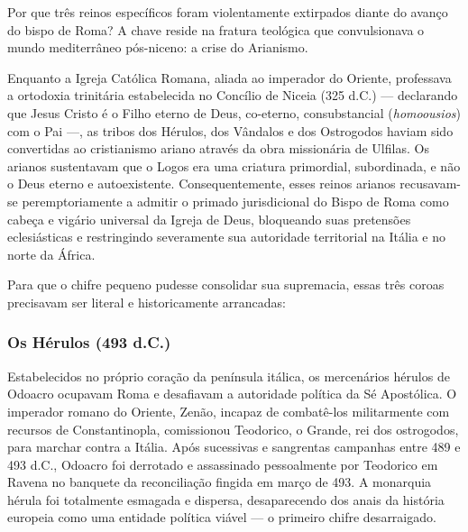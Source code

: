 Por que três reinos específicos foram violentamente extirpados diante do avanço do bispo de Roma? A chave reside na fratura teológica que convulsionava o mundo mediterrâneo pós-niceno: a crise do Arianismo.

Enquanto a Igreja Católica Romana, aliada ao imperador do Oriente, professava a ortodoxia trinitária estabelecida no Concílio de Niceia (325 d.C.) — declarando que Jesus Cristo é o Filho eterno de Deus, co-eterno, consubstancial (\textit{homoousios}) com o Pai —, as tribos dos Hérulos, dos Vândalos e dos Ostrogodos haviam sido convertidas ao cristianismo ariano através da obra missionária de Ulfilas. Os arianos sustentavam que o Logos era uma criatura primordial, subordinada, e não o Deus eterno e autoexistente. Consequentemente, esses reinos arianos recusavam-se peremptoriamente a admitir o primado jurisdicional do Bispo de Roma como cabeça e vigário universal da Igreja de Deus, bloqueando suas pretensões eclesiásticas e restringindo severamente sua autoridade territorial na Itália e no norte da África.

Para que o chifre pequeno pudesse consolidar sua supremacia, essas três coroas precisavam ser literal e historicamente arrancadas:


\subsubsection*{Os Hérulos (493 d.C.)}
Estabelecidos no próprio coração da península itálica, os mercenários hérulos de Odoacro ocupavam Roma e desafiavam a autoridade política da Sé Apostólica. O imperador romano do Oriente, Zenão, incapaz de combatê-los militarmente com recursos de Constantinopla, comissionou Teodorico, o Grande, rei dos ostrogodos, para marchar contra a Itália. Após sucessivas e sangrentas campanhas entre 489 e 493 d.C., Odoacro foi derrotado e assassinado pessoalmente por Teodorico em Ravena no banquete da reconciliação fingida em março de 493. A monarquia hérula foi totalmente esmagada e dispersa, desaparecendo dos anais da história europeia como uma entidade política viável — o primeiro chifre desarraigado.


